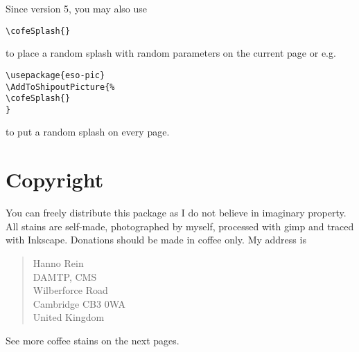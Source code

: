 \documentclass{article}
\begin{document}
\medskip
Since version 5, you may also use
\begin{verbatim}
\cofeSplash{}
\end{verbatim}
to place a random splash with random parameters on the current page or
e.g.
\begin{verbatim}
\usepackage{eso-pic}
\AddToShipoutPicture{%
\cofeSplash{}
}
\end{verbatim}
to put a random splash on every page.


\section{Copyright}
You can freely distribute this package as I do not believe in imaginary property. All stains are self-made, photographed by myself, processed with gimp and traced with Inkscape.
Donations should be made in coffee only. My address is
\begin{quote}
Hanno Rein\\
DAMTP, CMS\\
Wilberforce Road\\
Cambridge CB3 0WA\\
United Kingdom
\end{quote}
See more coffee stains on the next pages.
\newpage

\lipsum[1-42]
\end{document}
